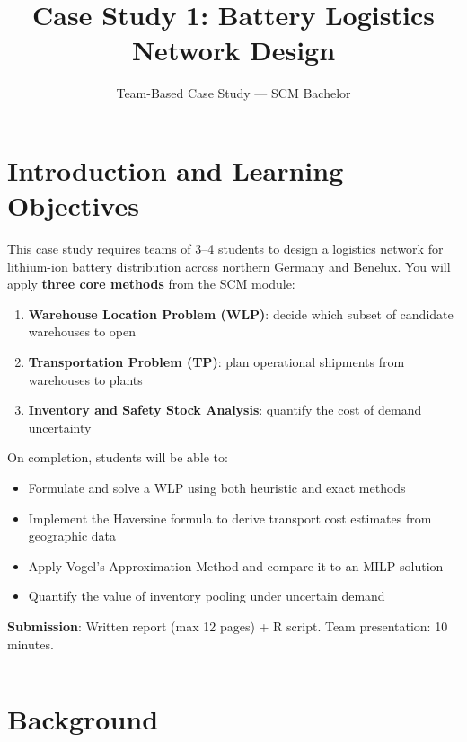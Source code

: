 \documentclass[
  a4paper,
]{article}
\title{Case Study 1: Battery Logistics Network Design}
\subtitle{Team-Based Case Study --- SCM Bachelor}
\author{}
\date{}
\providecommand{\tightlist}{%
  \setlength{\itemsep}{0pt}\setlength{\parskip}{0pt}}
\begin{document}
\maketitle


\section{Introduction and Learning
Objectives}\label{introduction-and-learning-objectives}

This case study requires teams of 3--4 students to design a logistics
network for lithium-ion battery distribution across northern Germany and
Benelux. You will apply \textbf{three core methods} from the SCM module:

\begin{enumerate}
\def\labelenumi{\arabic{enumi}.}
\tightlist
\item
  \textbf{Warehouse Location Problem (WLP)}: decide which subset of
  candidate warehouses to open
\item
  \textbf{Transportation Problem (TP)}: plan operational shipments from
  warehouses to plants
\item
  \textbf{Inventory and Safety Stock Analysis}: quantify the cost of
  demand uncertainty
\end{enumerate}

On completion, students will be able to:

\begin{itemize}
\tightlist
\item
  Formulate and solve a WLP using both heuristic and exact methods
\item
  Implement the Haversine formula to derive transport cost estimates
  from geographic data
\item
  Apply Vogel's Approximation Method and compare it to an MILP solution
\item
  Quantify the value of inventory pooling under uncertain demand
\end{itemize}

\textbf{Submission}: Written report (max 12 pages) + R script. Team
presentation: 10 minutes.

\begin{center}\rule{0.5\linewidth}{0.5pt}\end{center}

\section{Background}\label{background}
\end{document}
